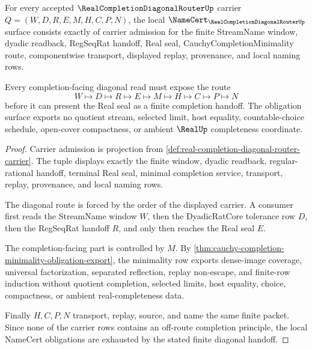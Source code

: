 \begin{theorem}
\label{thm:real-completion-diagonal-router-namecert-obligations}
For every accepted $\RealCompletionDiagonalRouterUp$ carrier $Q=(W,D,R,E,M,H,C,P,N)$, the local $\NameCert_{\RealCompletionDiagonalRouterUp}$ surface consists exactly of carrier admission for the finite StreamName window, dyadic readback, RegSeqRat handoff, Real seal, CauchyCompletionMinimality route, componentwise transport, displayed replay, provenance, and local naming rows.

Every completion-facing diagonal read must expose the route
$$
W\longmapsto D\longmapsto R\longmapsto E\longmapsto M\longmapsto H\longmapsto C\longmapsto P\longmapsto N
$$
before it can present the Real seal as a finite completion handoff. The obligation surface exports no quotient stream, selected limit, host equality, countable-choice schedule, open-cover compactness, or ambient $\RealUp$ completeness coordinate.
\end{theorem}
\begin{proof}
Carrier admission is projection from \autoref{def:real-completion-diagonal-router-carrier}. The tuple displays exactly the finite window, dyadic readback, regular-rational handoff, terminal Real seal, minimal completion service, transport, replay, provenance, and local naming rows.

The diagonal route is forced by the order of the displayed carrier. A consumer first reads the StreamName window $W$, then the DyadicRatCore tolerance row $D$, then the RegSeqRat handoff $R$, and only then reaches the Real seal $E$.

The completion-facing part is controlled by $M$. By \autoref{thm:cauchy-completion-minimality-obligation-export}, the minimality row exports dense-image coverage, universal factorization, separated reflection, replay non-escape, and finite-row induction without quotient completion, selected limits, host equality, choice, compactness, or ambient real-completeness data.

Finally $H,C,P,N$ transport, replay, source, and name the same finite packet. Since none of the carrier rows contains an off-route completion principle, the local NameCert obligations are exhausted by the stated finite diagonal handoff.
\end{proof}

